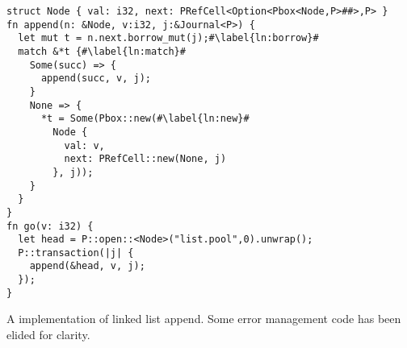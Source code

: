 \begin{lstfloat}
\begin{lstlisting}
struct Node { val: i32, next: PRefCell<Option<Pbox<Node,P>##>,P> }
fn append(n: &Node, v:i32, j:&Journal<P>) {
  let mut t = n.next.borrow_mut(j);#\label{ln:borrow}#
  match &*t {#\label{ln:match}#
    Some(succ) => {
      append(succ, v, j);
    }
    None => {
      *t = Some(Pbox::new(#\label{ln:new}#
        Node {
          val: v,
          next: PRefCell::new(None, j)
        }, j));
    }
  }
}
fn go(v: i32) {
  let head = P::open::<Node>("list.pool",0).unwrap();
  P::transaction(|j| {
    append(&head, v, j);
  });
}
\end{lstlisting}
\label{lst:example}
\caption{A \this{} implementation of linked list append.  Some error management code has been elided for clarity.}
\end{lstfloat}
